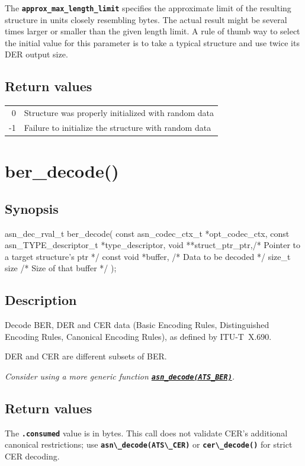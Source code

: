 \documentclass[english,oneside,12pt]{book}
\newcommand{\apisection}[2]{\clearpage\section{\label{#1}#2}}
\newcommand{\api}[2]{\hyperref[#1]{\code{#2}}}
\newcommand{\code}[1]{\texttt{\textbf{\lstinline{#1}}}}
\begin{document}
The \code{approx_max_length_limit} specifies the approximate limit of the
resulting structure in units closely resembling bytes. The actual result
might be several times larger or smaller than the given length limit.
A rule of thumb way to select the initial value for this parameter
is to take a typical structure and use twice its DER output size.

\subsection*{Return values}

\begin{tabular}[h!]{rl}
0 & Structure was properly initialized with random data \\
-1 & Failure to initialize the structure with random data
\end{tabular}

\apisection{sec:ber_decode}{ber\_decode()}

\subsection*{Synopsis}
\begin{signature}
asn_dec_rval_t ber_decode(
    const asn_codec_ctx_t *opt_codec_ctx,
    const asn_TYPE_descriptor_t *type_descriptor,
    void **struct_ptr_ptr,/* Pointer to a target structure's ptr */
    const void *buffer,   /* Data to be decoded */
    size_t size           /* Size of that buffer */
);
\end{signature}

\subsection*{Description}

Decode BER, DER and CER data
(Basic Encoding Rules, Distinguished Encoding Rules, Canonical Encoding Rules),
as defined by ITU-T~X.690.

DER and CER are different subsets of BER.\newline

\noindent\emph{Consider using a more generic function \api{sec:asn_decode}{asn_decode(ATS_BER)}.}

\subsection*{Return values}


The \code{.consumed} value is in bytes. This call does not validate CER's
additional canonical restrictions; use \code{asn\_decode(ATS\_CER)} or
\code{cer\_decode()} for strict CER decoding.
\end{document}
